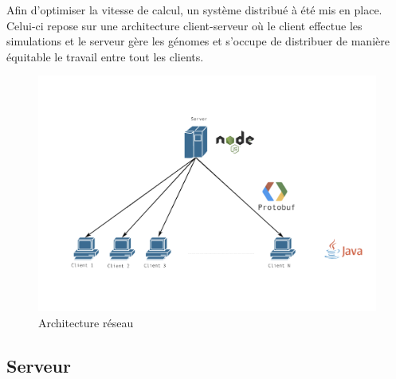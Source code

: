 \documentclass{article}
\begin{document}
Afin d'optimiser la vitesse de calcul, un système distribué à été mis en place. Celui-ci repose sur une architecture client-serveur où le client effectue les simulations et le serveur gère les génomes et s'occupe de distribuer de manière équitable le travail entre tout les clients.\\

\begin{figure}[H]
\begin{center}
	\includegraphics[scale=0.5]{archnet.png}
	\caption{Architecture réseau}
\end{center}
\end{figure}

\subsection{Serveur}
\end{document}
